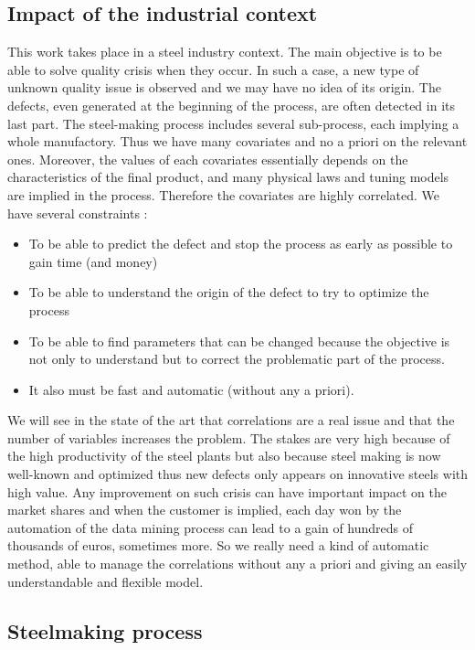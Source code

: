 \documentclass[12pt,a4paper]{report}
\begin{document}
	\subsection{Impact of the industrial context}
	This work takes place in a steel industry context. The main objective is to be able to solve quality crisis when they occur. In such a case, a new type of unknown quality issue is observed and we may have no idea of its origin. The defects, even generated at the beginning of the process, are often detected in its last part. The steel-making process includes several sub-process, each implying a whole manufactory. Thus we have many covariates and no a priori on the relevant ones. Moreover, the values of each covariates essentially depends on the characteristics of the final product, and many physical laws and tuning models are implied in the process. Therefore the covariates are highly correlated.
	We have several constraints :
	\begin{itemize}
		\item To be able to predict the defect and stop the process as early as possible to gain time (and money)
		\item To be able to understand the origin of the defect to try to optimize the process
		\item To be able to find parameters that can be changed because the objective is not only to understand but to correct the problematic part of the process.
		\item It also must be fast and automatic (without any a priori).
	\end{itemize}
	We will see in the state of the art that correlations are a real issue and that the number of variables increases the problem.	
	The stakes are very high because of the high productivity of the steel plants but also because steel making is now well-known and optimized thus new defects only appears on innovative steels with high value. Any improvement on such crisis can have important impact on the market shares and when the customer is implied, each day won by the automation of the data mining process can lead to a gain of hundreds of thousands of euros, sometimes more. So we really need a kind of automatic method, able to manage the correlations without any a priori and giving an easily understandable and flexible model.
	\subsection{Steelmaking process}
	
\end{document}
